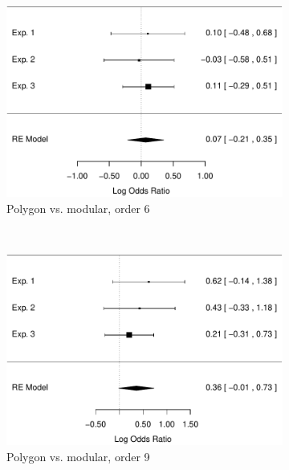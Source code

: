 \documentclass[man,mask,10pt]{apa6}
\begin{document}
\begin{figure}
\centering
\begin{subfigure}[c]{0.4\textwidth}
\centering
\includegraphics[width=\textwidth]{figures/meta/question_typegenerator_false_6_conditionpolygon.pdf}
\caption{Polygon vs. modular, order 6}
\end{subfigure}
~
\begin{subfigure}[c]{0.4\textwidth}
\centering
\includegraphics[width=\textwidth]{figures/meta/question_typegenerator_false_9_conditionpolygon.pdf}
\caption{Polygon vs. modular, order 9}
\end{subfigure} \\
\centering
\begin{subfigure}[c]{0.4\textwidth}
\centering

\end{subfigure}
\end{figure}
\end{document}

